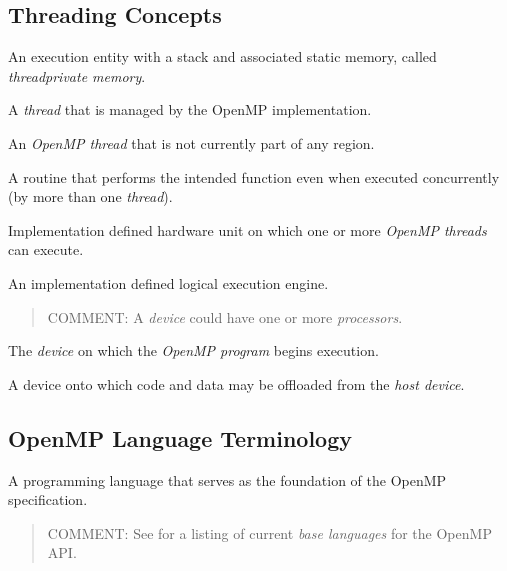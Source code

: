 \subsection{Threading Concepts}
\label{subsec:Threading Concepts}
\glossarydefstart
An execution entity with a stack and associated static memory, called 
\emph{threadprivate memory}.
\glossarydefend

\glossarydefstart
A \emph{thread} that is managed by the OpenMP implementation.
\glossarydefend

\glossarydefstart
An \emph{OpenMP thread} that is not currently part of any  region. 
\glossarydefend

\glossarydefstart
A routine that performs the intended function even when executed concurrently 
(by more than one \emph{thread}).
\glossarydefend

\glossarydefstart
Implementation defined hardware unit on which one or more \emph{OpenMP threads} can 
execute.
\glossarydefend

\glossarydefstart
An implementation defined logical execution engine.

\begin{quote}
COMMENT: A \emph{device} could have one or more \emph{processors}.
\end{quote}
\glossarydefend

\glossarydefstart
The \emph{device} on which the \emph{OpenMP program} begins execution.
\glossarydefend

\glossarydefstart
A device onto which code and data may be offloaded from the \emph{host device}.
\glossarydefend





\subsection{OpenMP Language Terminology}
\label{subsec:OpenMP Language Terminology}
\glossarydefstart
A programming language that serves as the foundation of the OpenMP 
specification.

\begin{quote}
COMMENT: See 
for a listing of current \emph{base languages} for the OpenMP API.
\end{quote}
\glossarydefend

